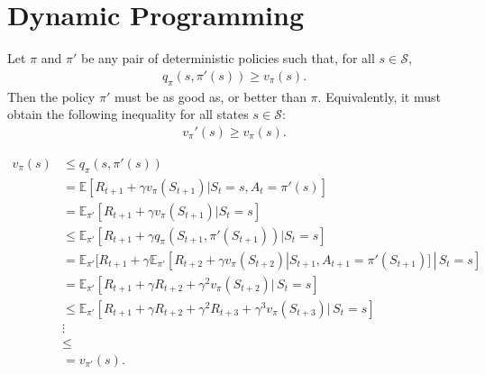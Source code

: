 \chapter{Dynamic Programming}

Let $\pi$ and $\pi'$ be any pair of deterministic policies such that, for all $s\in \mathcal{S}$, 
\begin{align*}
	q_\pi(s, \pi'(s))\geq v_\pi(s).	
\end{align*}
Then the policy $\pi'$ must be as good as, or better than $\pi$. Equivalently, it must obtain the following inequality for all states $s\in \mathcal{S}$:
\begin{align*}
	v_\pi'(s)\geq v_\pi(s).	
\end{align*}

\begin{align*}
	v_\pi(s)&\leq q_\pi(s, \pi'(s))	\\
	&= \mathbb{E}[R_{t+1}+\gamma v_\pi(S_{t+1})|S_t=s, A_t=\pi'(s)]\\
	&= \mathbb{E}_{\pi'}[R_{t+1}+\gamma v_\pi(S_{t+1})|S_t=s]\\
	&\leq \mathbb{E}_{\pi'}[R_{t+1}+\gamma q_\pi(S_{t+1}, \pi'(S_{t+1}))|S_t=s]\\
	&= \mathbb{E}_{\pi'}[R_{t+1}+\gamma \mathbb{E}_{\pi'}[R_{t+2}+\gamma v_\pi(S_{t+2})|S_{t+1}, A_{t+1}=\pi'(S_{t+1})]\,|\,S_t=s]\\
	&= \mathbb{E}_{\pi'}[R_{t+1}+\gamma R_{t+2}+\gamma^2 v_\pi(S_{t+2})|\,S_t=s]\\
	&\leq \mathbb{E}_{\pi'}[R_{t+1}+\gamma R_{t+2}+\gamma^2 R_{t+3}+\gamma^3 v_\pi(S_{t+3})|\,S_t=s]\\
	&\vdots\\
	&\leq\\
	&= v_{\pi'}(s).
\end{align*}


